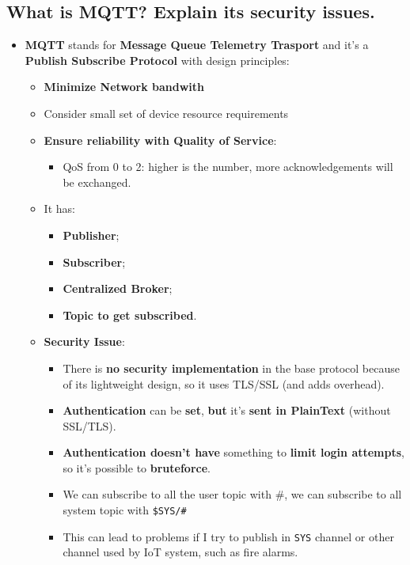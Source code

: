 \documentclass[9pt, letterpaper]{article}
\begin{document}
\subsection{What is MQTT? Explain its security issues.}
\begin{itemize}
	\item \textbf{MQTT} stands for \textbf{Message Queue Telemetry Trasport} and it's a \textbf{Publish Subscribe Protocol} with design principles:
	      \begin{itemize}
		      \item \textbf{Minimize Network bandwith}
		      \item Consider small set of device resource requirements
		      \item \textbf{Ensure reliability with Quality of Service}:
		            \begin{itemize}
			            \item QoS from 0 to 2: higher is the number, more acknowledgements will be exchanged.
		            \end{itemize}
		      \item It has:
		            \begin{itemize}
			            \item \textbf{Publisher};
			            \item \textbf{Subscriber};
			            \item \textbf{Centralized Broker};
			            \item \textbf{Topic to get subscribed}.
		            \end{itemize}
		      \item \textbf{Security Issue}:
		            \begin{itemize}
			            \item There is \textbf{no security implementation} in the base protocol because of its lightweight design, so it uses TLS/SSL (and adds overhead).
			            \item \textbf{Authentication} can be \textbf{set}, \textbf{but} it's \textbf{sent in PlainText} (without SSL/TLS).
			            \item \textbf{Authentication doesn't have} something to \textbf{limit login attempts}, so it's possible to \textbf{bruteforce}.
			            \item We can subscribe to all the user topic with \#, we can subscribe to all system topic with {\tt \$SYS/\#}
			            \item This can lead to problems if I try to publish in {\tt SYS} channel or other channel used by IoT system, such as fire alarms.
		            \end{itemize}
	      \end{itemize}
\end{itemize}
\end{document}
